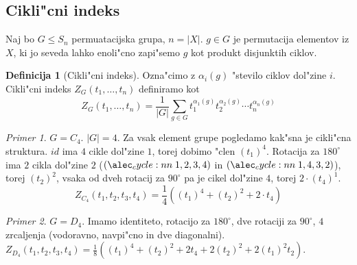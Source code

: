 \documentclass[a4paper,12pt]{article}
\theoremstyle{definition}
\newtheorem{defn}[counter]{Definicija}
\theoremstyle{remark}
\newtheorem*{ex}{Primer}
\begin{document}
\subsection{Cikli"cni indeks}
Naj bo $G \leqslant S_n$ permuatacijska grupa, $n=|X|$.
$g \in G$ je permutacija elementov iz $X$, ki jo seveda lahko enoli"cno zapi"semo $g$ kot produkt disjunktih ciklov.
\begin{defn}[Cikli"cni indeks]
	Ozna"cimo z $\alpha_i(g)$ "stevilo ciklov dol"zine $i$.
	Cikli"cni indeks $Z_G(t_1, \ldots, t_n)$ definiramo kot
	$$ Z_G(t_1, \ldots, t_n) = \frac{1}{|G|}\sum_{g \in G}t_1^{\alpha_1(g)}t_2^{\alpha_2(g)}\cdots t_n^{\alpha_n(g)} $$
\end{defn}
\begin{ex}
	$G=C_4$. $|G|=4$. Za vsak element grupe pogledamo kak"sna je cikli"cna struktura. $id$ ima $4$ cikle dol"zine $1$, torej dobimo "clen $(t_1)^4$. Rotacija za $180^{\circ}$ ima $2$ cikla dol"zine $2$ ($\cycle{1, 2, 3, 4}$ in $\cycle{1, 4, 3, 2}$), torej $(t_2)^2$, vsaka od dveh rotacij za $90^{\circ}$ pa je cikel dol"zine $4$, torej $2 \cdot (t_4)^1$.
	$$Z_{C_4}(t_1, t_2, t_3, t_4) = \frac{1}{4}((t_1)^4+(t_2)^2+2 \cdot t_4)$$
\end{ex}
\begin{ex}
	$G=D_4$. Imamo identiteto, rotacijo za $180^{\circ}$, dve rotaciji za $90^{\circ}$, $4$ zrcaljenja (vodoravno, navpi"cno in dve diagonalni). $Z_{D_4}(t_1, t_2, t_3, t_4) = \frac{1}{8}((t_1)^4+(t_2)^2+2t_4+2(t_2)^2+2(t_1)^2t_2)$.
\end{ex}
\end{document}
